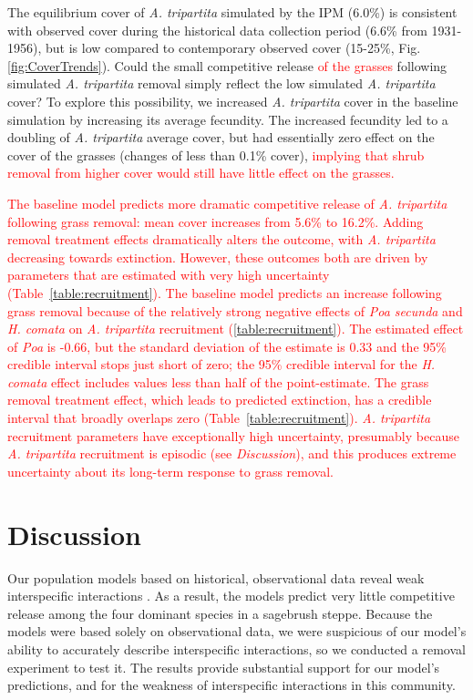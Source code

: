 \documentclass[11pt]{article}
\newcommand{\new}{\textcolor{red}}
\begin{document}
\begin{doublespacing}
The equilibrium cover of \textit{A. tripartita} simulated by the IPM (6.0\%) is consistent with observed cover during the historical data collection period (6.6\% from 1931-1956), but is low compared to contemporary observed cover (15-25\%, Fig. \ref{fig:CoverTrends}). Could the small competitive release \new{of the grasses} 
following simulated \textit{A. tripartita} removal simply reflect the low simulated \textit{A. tripartita} cover? To explore this possibility, we increased \textit{A. tripartita} cover in the baseline simulation by increasing its average fecundity. The increased fecundity led to a doubling of \textit{A. tripartita} average cover, but had essentially zero effect on the cover of the grasses (changes of less than 0.1\% cover), \new{implying that shrub removal from higher cover 
would still have little effect on the grasses.} 
 
\new{The baseline model predicts more dramatic competitive release of \textit{A. tripartita} following grass removal: mean cover increases from 5.6\% to 16.2\%. Adding
removal treatment effects dramatically alters the outcome, with \textit{A. tripartita} decreasing towards extinction. However, these outcomes both are driven
by parameters that are estimated with very high uncertainty (Table~\ref{table:recruitment}). The baseline model predicts an increase following grass removal because of the relatively strong negative effects of \textit{Poa secunda} and \textit{H. comata} on \textit{A. tripartita} recruitment (\ref{table:recruitment}). The estimated effect of
\emph{Poa} is -0.66, but the standard deviation of the estimate is 0.33 and the 95\% credible interval stops just short of zero; the 95\% credible interval for the
\textit{H. comata} effect includes values less than half of the point-estimate. The grass removal treatment effect, which leads to predicted extinction, has a credible 
interval that broadly overlaps zero (Table~\ref{table:recruitment}). \textit{A. tripartita} recruitment parameters have exceptionally high uncertainty, presumably 
because \textit{A. tripartita} recruitment is episodic (see \emph{Discussion}), and this produces extreme uncertainty about its long-term 
response to grass removal.} 

\section*{Discussion}

Our population models based on historical, observational data reveal weak interspecific interactions \citep{adler_coexistence_2010,chu_large_2015}. As a result, the 
models predict very little competitive release among the four dominant species in a sagebrush steppe. Because the models were based solely on observational
data, we were suspicious of our model's ability to accurately describe interspecific interactions, so we conducted a removal experiment to test it. 
The results provide substantial support for our model's predictions, and for the weakness of interspecific interactions in this community. 


\end{doublespacing}
\end{document}
